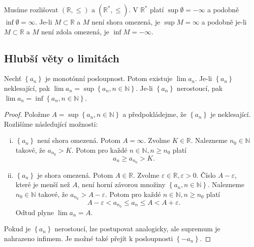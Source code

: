 \begin{poznamka}
	Musíme rozlišovat $(\mathbb R , \leq)$ a $(\mathbb R ^*, \leq)$. V $\mathbb R ^*$
	platí $\sup \emptyset = -\infty$ a podobně $\inf \emptyset  = \infty$. Je-li $M \subset \mathbb R $
	a $M$ není shora omezená, je $\sup M = \infty$ a podobně je-li $M\subset \mathbb R $ a $M$ není zdola omezená,
	je $\inf M = -\infty$.
\end{poznamka}

\subsection{Hlubší věty o limitách}
\begin{veta}\label{v213} %
	Nechť $\left \{ a_n \right \} $ je monotónní posloupnost. Potom existuje $\lim a_n$.
	Je-li $\left \{ a_n \right \} $ neklesající, pak $\lim a_n = \sup \left \{ a_n, n \in \mathbb N  \right \} $.
	Je-li $\left \{ a_n \right \} $ nerostoucí, pak $\lim a_n = \inf \left \{ a_n, n \in \mathbb N  \right \} $.
\end{veta}

\begin{proof}
	Položme $A=\sup \left \{ a_n, n\in \mathbb N  \right \} $ a předpokládejme, že $\left \{ a_n \right \} $
	je neklesající. Rozlišíme následující možnosti:
	\begin{enumerate}[(i)]
		\item $\left \{ a_n \right \} $ není shora omezená. Potom $A = \infty$. Zvolme $K\in \mathbb R $.
		Nalezneme $n_0\in \mathbb N $ takové, že $a_{n_0} > K$. Potom pro každé $n\in \mathbb N , n\geq n_0$
		platí
		$$
		    a_n \geq a_{n_0} > K.
		$$
		\item $\left \{ a_n \right \} $ je shora omezená. Potom $A\in \mathbb R $. Zvolme
		$\varepsilon \in \mathbb R ,\varepsilon > 0$. Číslo $A-\varepsilon$, které je menší než $A$, není
		horní závorou množiny $\left \{ a_n, n\in \mathbb N  \right \} $. Nalezneme $n_0 \in \mathbb N $
		takové, že $a_{n_0} > A-\varepsilon$. Potom pro každé $n \in \mathbb N , n \geq n_0$ platí
		$$
		    A - \varepsilon < a_{n_0}\leq a_n \leq A < A+ \varepsilon.
		$$
		Odtud plyne $\lim a_n = A$.
	\end{enumerate}
	Pokud je $\left \{ a_n \right \} $ nerostoucí, lze postupovat analogicky, ale supremum je nahrazeno
	infimem. Je možné také přejít k posloupnosti $\left \{ -a_n \right \} $.
\end{proof}

